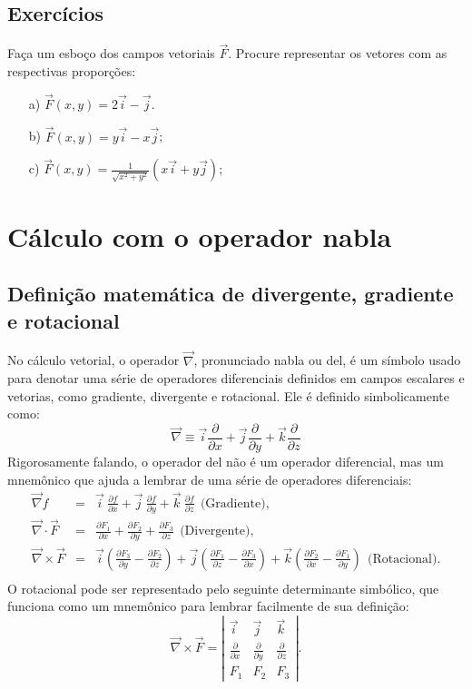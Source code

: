 \subsection*{Exercícios}
\begin{exer}
 Faça um esboço dos campos vetoriais $\vec{F}$. Procure representar os vetores com as respectivas proporções:
 \begin{itemize}
  \item[a)] $\vec{F}(x,y)=2\vec{i}-\vec{j}$.
  \item[b)] $\vec{F}(x,y)=y\vec{i}-x\vec{j}$;
  \item[c)] $\vec{F}(x,y)=\frac{1}{\sqrt{x^2+y^2}}\left(x\vec{i}+y\vec{j}\right)$;
 \end{itemize}
\end{exer}


\section{Cálculo com o operador nabla}
\subsection{Definição matemática de divergente, gradiente e rotacional}
No cálculo vetorial, o operador $\vec{\nabla}$, pronunciado nabla ou del, é um símbolo usado para denotar uma série de operadores diferenciais definidos em campos escalares e vetorias, como gradiente, divergente e rotacional. Ele é definido simbolicamente como:
\begin{equation}\label{def_del}
\vec{\nabla} \equiv \vec{i}\frac{\partial}{\partial x}+\vec{j}\frac{\partial}{\partial y}+\vec{k}\frac{\partial}{\partial z}
\end{equation}
Rigorosamente falando, o operador del não é um operador diferencial, mas um mnemônico que ajuda a lembrar de uma série de operadores diferenciais:
\begin{eqnarray*}
 \vec{\nabla}f &=& \vec{i}~\!\frac{\partial f}{\partial x}+\vec{j}~\!\frac{\partial f}{\partial y}+\vec{k}~\!\frac{\partial f}{\partial z} ~~ \text{(Gradiente)},\\
 \vec{\nabla}\cdot \vec{F} &=& \frac{\partial F_1}{\partial x}+\frac{\partial F_2}{\partial y}+\frac{\partial F_3}{\partial z} ~~ \text{(Divergente)},\\
 \vec{\nabla}\times \vec{F} &=&  \vec{i}\left(\frac{\partial F_3}{\partial y}-\frac{\partial F_2}{\partial z}\right) + \vec{j}\left(\frac{\partial F_1}{\partial z}-\frac{\partial F_3}{\partial x}\right) + \vec{k}\left(\frac{\partial F_2}{\partial x}-\frac{\partial F_1}{\partial y}\right)~~ \text{(Rotacional)}.\\
\end{eqnarray*}
O rotacional pode ser representado pelo seguinte determinante simbólico, que funciona como um mnemônico para lembrar facilmente de sua definição:
$$
 \vec{\nabla}\times \vec{F}=\left|
 \begin{array}{ccc}
 \vec{i} & \vec{j} & \vec{k} \\
 \frac{\partial}{\partial x} &\frac{\partial}{\partial y} &\frac{\partial}{\partial z} \\
F_1 & F_2 & F_3
 \end{array}
\right|.
$$

